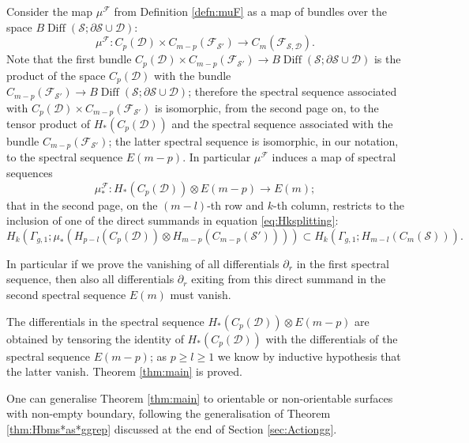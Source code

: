 \documentclass{amsart}
\theoremstyle{plain}
\theoremstyle{definition}
\newcommand{\D}{\mathcal{D}}
\newcommand{\cF}{\mathcal{F}}
\renewcommand{\S}{\mathcal{S}}
\renewcommand{\gg}{\Gamma_{g,1}}
\newcommand{\cms}{C_m(\S)}
\newcommand{\pa}[1]{\left(#1\right)}
\DeclareMathOperator{\Diff}{Diff}
\begin{document}
Consider the map $\mu^{\cF}$ from Definition \ref{defn:muF} as a map of
bundles over the space $B\Diff(\S;\partial\S\cup\D)$:
\[
 \mu^{\cF}\colon C_p(\D)\times C_{m-p}(\cF_{\S'})\to C_m(\cF_{\S,\D}).
\]
Note that the first bundle $C_p(\D)\times C_{m-p}(\cF_{\S'})\to B\Diff(\S;\partial\S\cup\D)$
is the product of the space $C_p(\D)$ with the bundle $C_{m-p}(\cF_{\S'})\to B\Diff(\S;\partial\S\cup\D)$;
therefore the spectral sequence associated with $C_p(\D)\times C_{m-p}(\cF_{\S'})$ is isomorphic,
from the second page on, to the tensor product
of $H_*(C_p(\D))$ and the spectral sequence associated with the bundle $C_{m-p}(\cF_{\S'})$; the
latter spectral sequence is isomorphic, in our notation, to the spectral sequence $E(m-p)$.
In particular $\mu^{\cF}$ induces a map of spectral
sequences
\[
\mu^{\cF}_*\colon H_*(C_p(\D))\otimes E(m-p)\to E(m);
\]
that in the second page, on the $(m-l)$-th row and $k$-th column, restricts to
the inclusion of one of the direct summands in equation \eqref{eq:Hksplitting}:
\[
H_k\pa{\gg;\mu_*(H_{p-l}(C_p(\D))\otimes H_{m-p}(C_{m-p}(\S')))}\subset H_k\pa{\gg;H_{m-l}(\cms)}.
\]

In particular if we prove the vanishing of all differentials $\partial_r$
in the first spectral sequence, then also all differentials
$\partial_r$ exiting from this direct summand in the
second spectral sequence $E(m)$ must vanish.

The differentials in the spectral sequence $H_*(C_p(\D))\otimes E(m-p)$
are obtained by tensoring the identity of $H_*(C_p(\D))$ with the differentials
of the spectral sequence $E(m-p)$; as $p\geq l\geq 1$ we know by inductive hypothesis
that the latter vanish. Theorem \ref{thm:main} is proved.

One can generalise Theorem \ref{thm:main} to orientable or non-orientable
surfaces with non-empty boundary, following the generalisation
of Theorem \ref{thm:Hbms*as*ggrep} discussed at the end of Section \ref{sec:Actiongg}.
\end{document}
